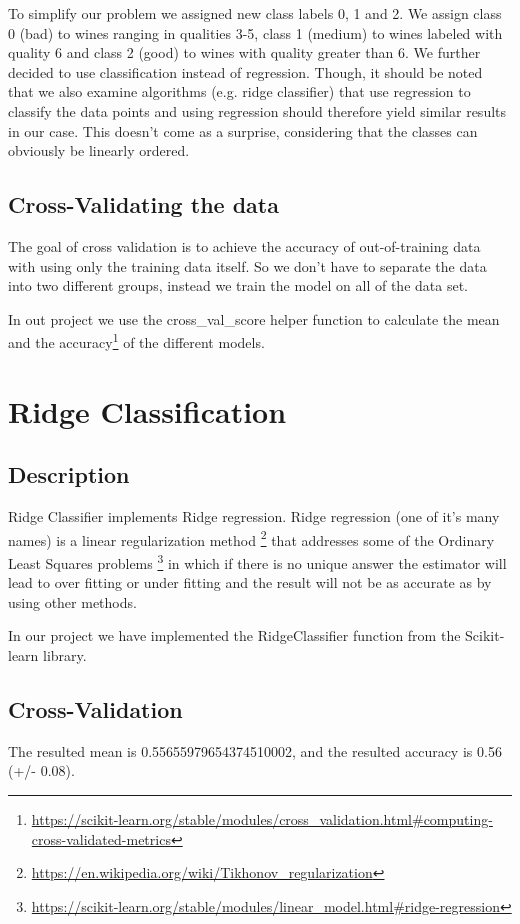 \documentclass[twocolumn]{scrartcl}
\begin{document}
To simplify our problem we assigned new class labels 0, 1 and 2. We assign class 0 (bad) to wines ranging in qualities 3-5,
class 1 (medium) to wines labeled with quality 6 and class 2 (good) to wines with quality greater than 6.
We further decided to use classification instead of regression.
Though, it should be noted that we also examine algorithms (e.g. ridge classifier) that use regression to classify the data points
and using regression should therefore yield similar results in our case.
This doesn't come as a surprise, considering that the classes can obviously be linearly ordered.

\subsection{Cross-Validating the data}
The goal of cross validation is to achieve the accuracy of out-of-training data with using only the training data itself. So we don't have to separate the data into two different groups, instead we train the model on all of the data set. 

In out project we use the cross\_val\_score helper function to calculate the mean and the accuracy\footnote{\url{https://scikit-learn.org/stable/modules/cross_validation.html\#computing-cross-validated-metrics}} of the different models.

\section{Ridge Classification}
\subsection{Description}
Ridge Classifier implements Ridge regression.
Ridge regression (one of it's many names) is a linear regularization method
\footnote{\url{https://en.wikipedia.org/wiki/Tikhonov_regularization}} 
that addresses some of the Ordinary Least Squares problems
\footnote{\url{https://scikit-learn.org/stable/modules/linear_model.html\#ridge-regression}}
in which if there is no unique answer the estimator will lead to over fitting or under fitting and the result will not be as accurate as by using other methods.

In our project we have implemented the RidgeClassifier function from the Scikit-learn library.
\subsection{Cross-Validation}
The resulted mean is 0.55655979654374510002, and the resulted accuracy is 0.56 (+/- 0.08).
\end{document}
